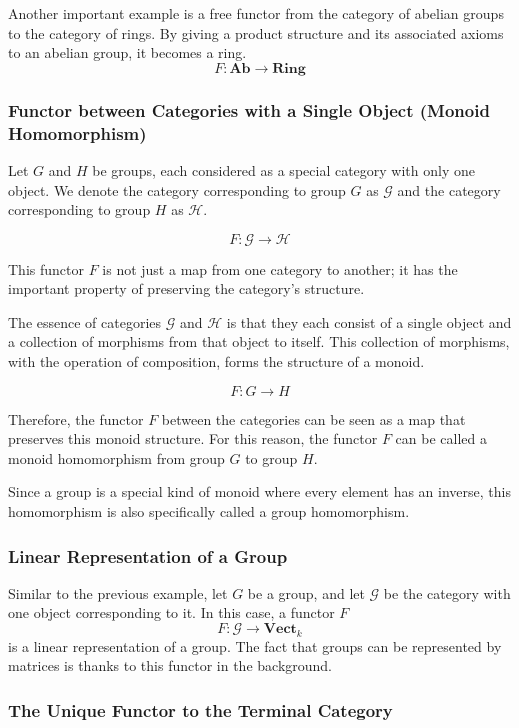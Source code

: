 \documentclass[uplatex,a4j,12pt,dvipdfmx]{jsarticle}
\begin{document}
Another important example is a free functor from the category of abelian groups to the category of rings. By giving a product structure and its associated axioms to an abelian group, it becomes a ring.
$$F : \textbf{Ab} \to \textbf{Ring}$$


\subsubsection{Functor between Categories with a Single Object (Monoid Homomorphism)}

Let $G$ and $H$ be groups, each considered as a special category with only one object. We denote the category corresponding to group $G$ as $\mathcal{G}$ and the category corresponding to group $H$ as $\mathcal{H}$.

$$F: \mathcal{G} \to \mathcal{H}$$

This functor $F$ is not just a map from one category to another; it has the important property of preserving the category's structure.

The essence of categories $\mathcal{G}$ and $\mathcal{H}$ is that they each consist of a single object and a collection of morphisms from that object to itself. This collection of morphisms, with the operation of composition, forms the structure of a monoid.

$$F: G \to H$$

Therefore, the functor $F$ between the categories can be seen as a map that preserves this monoid structure. For this reason, the functor $F$ can be called a monoid homomorphism from group $G$ to group $H$.

Since a group is a special kind of monoid where every element has an inverse, this homomorphism is also specifically called a group homomorphism.




\subsubsection{Linear Representation of a Group}

Similar to the previous example, let $G$ be a group, and let $\mathcal{G}$ be the category with one object corresponding to it.
In this case, a functor $F$
$$F : \mathcal{G} \to \mathbf{Vect}_{k} $$
is a linear representation of a group.
The fact that groups can be represented by matrices is thanks to this functor in the background.


\subsubsection{The Unique Functor to the Terminal Category}
\end{document}
